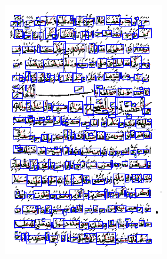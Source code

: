 \documentclass[conference,a4paper,twocolumn]{IEEEtran}
\begin{document}
\begin{figure}
\begin{minipage}{.30\linewidth}
  \includegraphics[width=\linewidth]{figures/patches_example_connected_components.png}
  \label{img2}
\end{minipage}
\end{figure}

\end{document}

